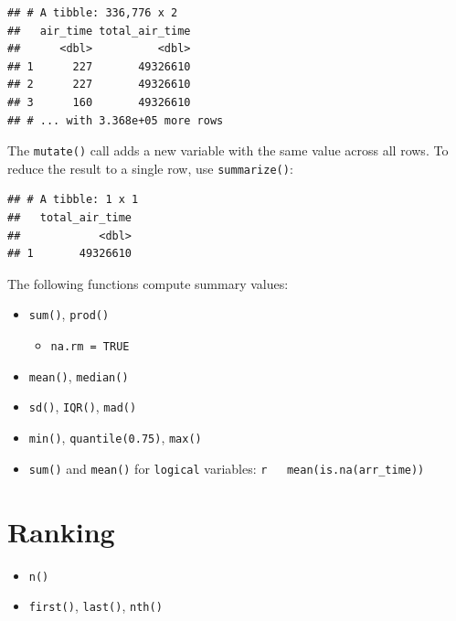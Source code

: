 \documentclass[]{book}
\newenvironment{Shaded}{}{}
\newcommand{\DataTypeTok}[1]{#1}
\newcommand{\KeywordTok}[1]{\textcolor[rgb]{0.00,0.00,1.00}{#1}}
\newcommand{\NormalTok}[1]{#1}
\newcommand{\OperatorTok}[1]{#1}
\newcommand{\OtherTok}[1]{\textcolor[rgb]{1.00,0.25,0.00}{#1}}
\newcommand{\StringTok}[1]{\textcolor[rgb]{0.00,0.50,0.50}{#1}}
\providecommand{\tightlist}{%
  \setlength{\itemsep}{0pt}\setlength{\parskip}{0pt}}
\begin{document}
\begin{verbatim}
## # A tibble: 336,776 x 2
##   air_time total_air_time
##      <dbl>          <dbl>
## 1      227       49326610
## 2      227       49326610
## 3      160       49326610
## # ... with 3.368e+05 more rows
\end{verbatim}

The \texttt{mutate()} call adds a new variable with the same value across all rows.
To reduce the result to a single row, use \texttt{summarize()}:

\begin{Shaded}
\end{Shaded}

\begin{verbatim}
## # A tibble: 1 x 1
##   total_air_time
##            <dbl>
## 1       49326610
\end{verbatim}

The following functions compute summary values:

\begin{itemize}
\tightlist
\item
  \texttt{sum()}, \texttt{prod()}

  \begin{itemize}
  \tightlist
  \item
    \texttt{na.rm\ =\ TRUE}
  \end{itemize}
\item
  \texttt{mean()}, \texttt{median()}
\item
  \texttt{sd()}, \texttt{IQR()}, \texttt{mad()}
\item
  \texttt{min()}, \texttt{quantile(0.75)}, \texttt{max()}
\item
  \texttt{sum()} and \texttt{mean()} for \texttt{logical} variables:
  \texttt{r\ \ \ mean(is.na(arr\_time))}
\end{itemize}

\hypertarget{ranking}{%
\section{Ranking}\label{ranking}}

\begin{itemize}
\tightlist
\item
  \texttt{n()}
\item
  \texttt{first()}, \texttt{last()}, \texttt{nth()}
\end{itemize}
\end{document}
